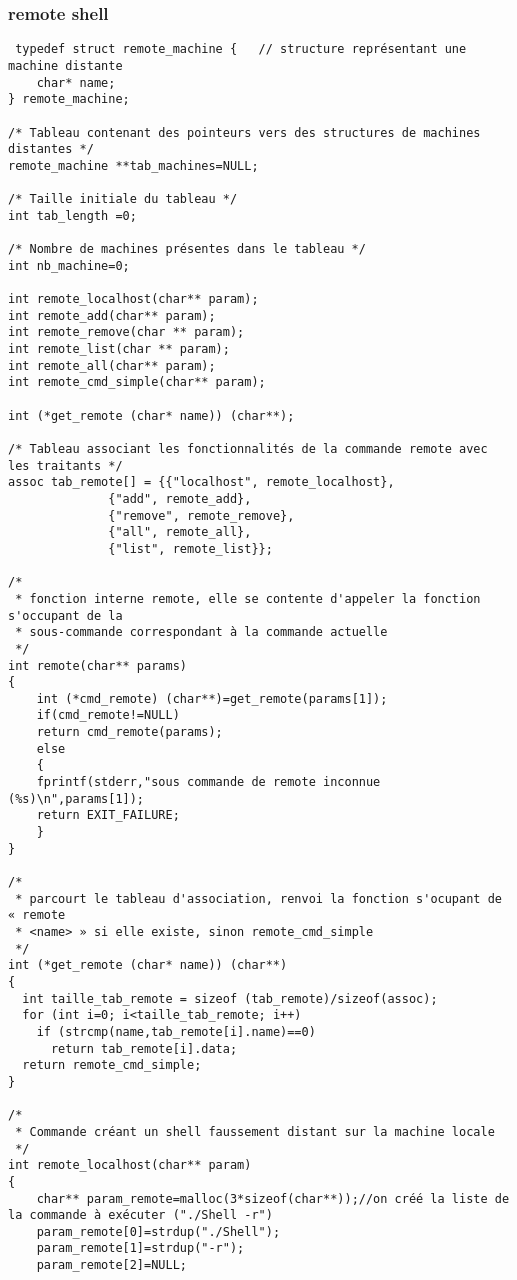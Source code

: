 \documentclass[12pt]{article}
\begin{document}
\subsubsection{remote shell}
\label{remote shell}
\begin{verbatim}
 typedef struct remote_machine {   // structure représentant une machine distante
    char* name;
} remote_machine;

/* Tableau contenant des pointeurs vers des structures de machines distantes */
remote_machine **tab_machines=NULL;

/* Taille initiale du tableau */
int tab_length =0;

/* Nombre de machines présentes dans le tableau */
int nb_machine=0;

int remote_localhost(char** param);
int remote_add(char** param);
int remote_remove(char ** param);
int remote_list(char ** param);
int remote_all(char** param);
int remote_cmd_simple(char** param);
			  
int (*get_remote (char* name)) (char**);

/* Tableau associant les fonctionnalités de la commande remote avec les traitants */ 			  
assoc tab_remote[] = {{"localhost", remote_localhost},
		      {"add", remote_add},
		      {"remove", remote_remove},
		      {"all", remote_all},
		      {"list", remote_list}};

/*
 * fonction interne remote, elle se contente d'appeler la fonction s'occupant de la 
 * sous-commande correspondant à la commande actuelle
 */
int remote(char** params)
{
    int (*cmd_remote) (char**)=get_remote(params[1]);
    if(cmd_remote!=NULL)
	return cmd_remote(params);
    else
    {
	fprintf(stderr,"sous commande de remote inconnue (%s)\n",params[1]);
	return EXIT_FAILURE;
    }
}

/*
 * parcourt le tableau d'association, renvoi la fonction s'ocupant de « remote
 * <name> » si elle existe, sinon remote_cmd_simple
 */
int (*get_remote (char* name)) (char**) 
{
  int taille_tab_remote = sizeof (tab_remote)/sizeof(assoc);
  for (int i=0; i<taille_tab_remote; i++)
    if (strcmp(name,tab_remote[i].name)==0)
      return tab_remote[i].data;
  return remote_cmd_simple;
}

/*
 * Commande créant un shell faussement distant sur la machine locale 
 */
int remote_localhost(char** param)
{
    char** param_remote=malloc(3*sizeof(char**));//on créé la liste de la commande à exécuter ("./Shell -r")
    param_remote[0]=strdup("./Shell");
    param_remote[1]=strdup("-r");
    param_remote[2]=NULL;
    

\end{verbatim}
\end{document}
